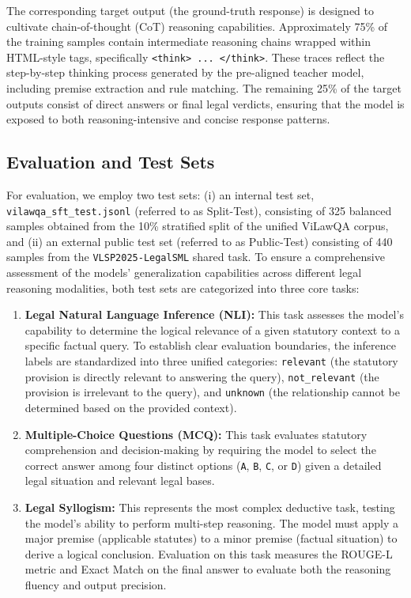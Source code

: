 The corresponding target output (the ground-truth response) is designed to cultivate chain-of-thought (CoT) reasoning capabilities. Approximately 75\% of the training samples contain intermediate reasoning chains wrapped within HTML-style tags, specifically \texttt{<think> ... </think>}. These traces reflect the step-by-step thinking process generated by the pre-aligned teacher model, including premise extraction and rule matching. The remaining 25\% of the target outputs consist of direct answers or final legal verdicts, ensuring that the model is exposed to both reasoning-intensive and concise response patterns.

\subsection{Evaluation and Test Sets}

For evaluation, we employ two test sets: (i) an internal test set, \texttt{vilawqa\_sft\_test.jsonl} (referred to as Split-Test), consisting of 325 balanced samples obtained from the 10\% stratified split of the unified ViLawQA corpus, and (ii) an external public test set (referred to as Public-Test) consisting of 440 samples from the \texttt{VLSP2025-LegalSML} shared task. To ensure a comprehensive assessment of the models' generalization capabilities across different legal reasoning modalities, both test sets are categorized into three core tasks:
\begin{enumerate}
    \item \textbf{Legal Natural Language Inference (NLI):} This task assesses the model's capability to determine the logical relevance of a given statutory context to a specific factual query. To establish clear evaluation boundaries, the inference labels are standardized into three unified categories: \texttt{relevant} (the statutory provision is directly relevant to answering the query), \texttt{not\_relevant} (the provision is irrelevant to the query), and \texttt{unknown} (the relationship cannot be determined based on the provided context).
    \item \textbf{Multiple-Choice Questions (MCQ):} This task evaluates statutory comprehension and decision-making by requiring the model to select the correct answer among four distinct options (\texttt{A}, \texttt{B}, \texttt{C}, or \texttt{D}) given a detailed legal situation and relevant legal bases.
    \item \textbf{Legal Syllogism:} This represents the most complex deductive task, testing the model's ability to perform multi-step reasoning. The model must apply a major premise (applicable statutes) to a minor premise (factual situation) to derive a logical conclusion. Evaluation on this task measures the ROUGE-L metric and Exact Match on the final answer to evaluate both the reasoning fluency and output precision.
\end{enumerate}

